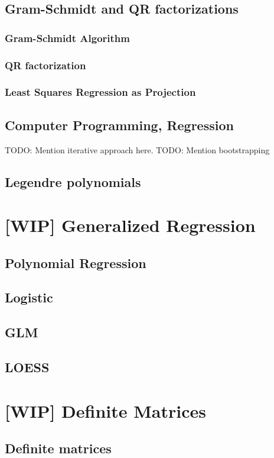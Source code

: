 \documentclass{amsbook}
\begin{document}
\section{Gram-Schmidt and QR factorizations}
\subsection{Gram-Schmidt Algorithm}
\subsection{QR factorization}
\subsection{Least Squares Regression as Projection}

\section{Computer Programming, Regression}
TODO: Mention iterative approach here.
TODO: Mention bootstrapping

\section{Legendre polynomials}

\chapter{[WIP] Generalized Regression}
\section{Polynomial Regression}
\section{Logistic}
\section{GLM}
\section{LOESS}

\chapter{[WIP] Definite Matrices}
\section{Definite matrices}
\end{document}
